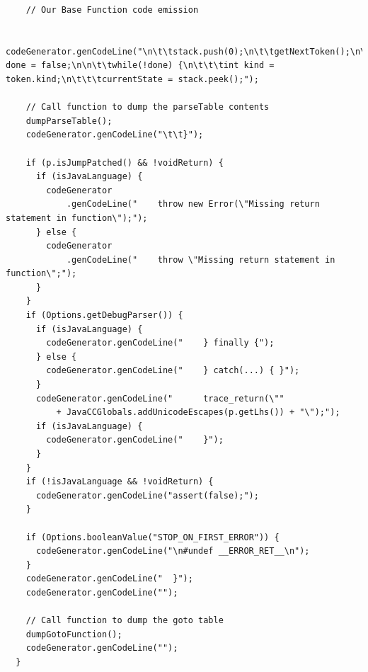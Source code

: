 \documentclass[oneside]{book}
\begin{document}
\begin{lstlisting}
    // Our Base Function code emission
    
    codeGenerator.genCodeLine("\n\t\tstack.push(0);\n\t\tgetNextToken();\n\t\tboolean done = false;\n\n\t\twhile(!done) {\n\t\t\tint kind = token.kind;\n\t\t\tcurrentState = stack.peek();");
    
    // Call function to dump the parseTable contents
    dumpParseTable();
    codeGenerator.genCodeLine("\t\t}");
    
    if (p.isJumpPatched() && !voidReturn) {
      if (isJavaLanguage) {
        codeGenerator
            .genCodeLine("    throw new Error(\"Missing return statement in function\");");
      } else {
        codeGenerator
            .genCodeLine("    throw \"Missing return statement in function\";");
      }
    }
    if (Options.getDebugParser()) {
      if (isJavaLanguage) {
        codeGenerator.genCodeLine("    } finally {");
      } else {
        codeGenerator.genCodeLine("    } catch(...) { }");
      }
      codeGenerator.genCodeLine("      trace_return(\""
          + JavaCCGlobals.addUnicodeEscapes(p.getLhs()) + "\");");
      if (isJavaLanguage) {
        codeGenerator.genCodeLine("    }");
      }
    }
    if (!isJavaLanguage && !voidReturn) {
      codeGenerator.genCodeLine("assert(false);");
    }

    if (Options.booleanValue("STOP_ON_FIRST_ERROR")) {
      codeGenerator.genCodeLine("\n#undef __ERROR_RET__\n");
    }
    codeGenerator.genCodeLine("  }");
    codeGenerator.genCodeLine("");

    // Call function to dump the goto table
    dumpGotoFunction();
    codeGenerator.genCodeLine("");
  }
\end{lstlisting}

 
\end{document}
